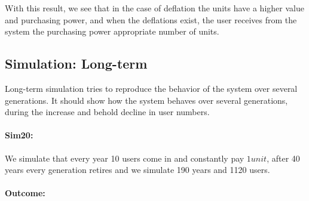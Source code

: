\begin{table}[hbt!]
\centering
{}
\end{table}


With this result, we see that in the case of deflation the units have a higher value and purchasing power, and when the deflations exist, the user receives from the system the purchasing power appropriate number of units.


\subsection{Simulation: Long-term}

Long-term simulation tries to reproduce the behavior of the system over several generations. It should show how the system behaves over several generations, during the increase and behold decline in user numbers.

\paragraph{Sim20:} We simulate that every year 10 users come in and constantly pay $1 unit$, after 40 years every generation retires and we simulate 190 years and 1120 users.

\paragraph{Outcome:}

